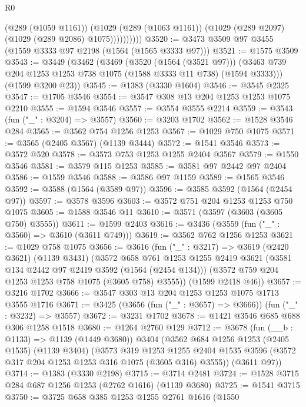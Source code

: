 \begin{lexlean}{R0}
\begin{coremodule}
                  (@289 (@1059 @1161))
                  (@1029
                    (@289 (@1063 @1161))
                    (@1029 (@289 @2097) (@1029 (@289 @2086) @1075))))))))))
@3520 := @3473 @3509 @97 @3455 (@1559 @3333 @97 @2198 (@1564 (@1565 @3333 @97)))
@3521 := @1575 @3509
@3543 := @3449
    (@3462
      (@3469
        (@3520 (@1564 (@3521 @97)))
        (@3463 @739 @204 @1253 @1253 @738 @1075 (@1588 @3333 @11 @738) (@1594 @3333)))
      (@1599 @3200 @23))
@3545 := @1383 (@3330 @1604)
@3546 := @3545 @2325
@3547 := @1705 @3546
@3554 := @3547 @308 @13 @204 @1253 @1253 @1075 @2210
@3555 := @1594 @3546
@3557 := @3554 @3555 @2214
@3559 := @3543 (fun ("_" : @3204) => @3557)
@3560 := @3203 @1702
@3562 := @1528 @3546 @284
@3565 := @3562 @754 @1256 @1253
@3567 := @1029 @750 @1075
@3571 := @3565 (@2405 @3567) (@1139 @3444)
@3572 := @1541 @3546
@3573 := @3572 @520
@3578 := @3573 @753 @1253 @1255 @2404 @3567
@3579 := @1550 @3546
@3581 := @3579 @115 @1253
@3585 := @3581 @97 @2442 @97 @2404
@3586 := @1559 @3546
@3588 := @3586 @97 @1159
@3589 := @1565 @3546
@3592 := @3588 (@1564 (@3589 @97))
@3596 := @3585 @3592 (@1564 (@2454 @97))
@3597 := @3578 @3596
@3603 := @3572 @751 @204 @1253 @1253 @750 @1075
@3605 := @1588 @3546 @11
@3610 := @3571 (@3597 (@3603 (@3605 @750) @3555))
@3611 := @1599 @2403
@3616 := @3436 (@3559 (fun ("_" : @3560) => @3610 (@3611 @749)))
@3619 := @3562 @762 @1256 @1253
@3621 := @1029 @758 @1075
@3656 := @3616
    (fun ("_" : @3217) =>
    @3619
      (@2420 @3621)
      (@1139 @3431)
      (@3572
        @658
        @761
        @1253
        @1255
        @2419
        @3621
        (@3581 @134 @2442 @97 @2419 @3592 (@1564 (@2454 @134)))
        (@3572 @759 @204 @1253 @1253 @758 @1075 (@3605 @758) @3555))
      (@1599 @2418 @46))
@3657 := @3216 @1702
@3666 := @3547 @303 @13 @204 @1253 @1253 @1075 @1713 @3555 @1716
@3671 := @3425 (@3656 (fun ("_" : @3657) => @3666)) (fun ("_" : @3232) => @3557)
@3672 := @3231 @1702
@3678 := @1421 @3546 @685 @688 @306 @1258 @1518
@3680 := @1264 @2760 @129
@3712 := @3678
    (fun (__b : @1133) => @1139 (@1449 @3680))
    @3404
    (@3562
      @684
      @1256
      @1253
      (@2405 @1535)
      (@1139 @3404)
      (@3573
        @319
        @1253
        @1255
        @2404
        @1535
        @3596
        (@3572 @317 @204 @1253 @1253 @316 @1075 (@3605 @316) @3555))
      (@3611 @97))
@3714 := @1383 (@3330 @2198)
@3715 := @3714 @2481
@3724 := @1528 @3715 @284 @687 @1256 @1253 (@2762 @1616) (@1139 @3680)
@3725 := @1541 @3715
@3750 := @3725
    @658
    @385
    @1253
    @1255
    @2761
    @1616
    (@1550

\end{coremodule}
\end{lexlean}
